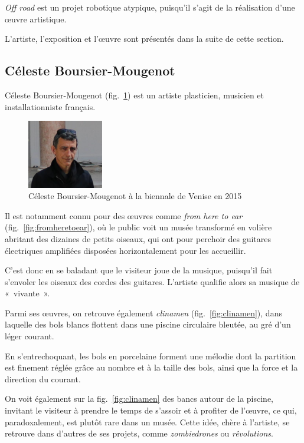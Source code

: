 \documentclass[french,A4paper,]{book}
\begin{document}
\emph{Off road} est un projet robotique atypique, puisqu'il s'agit de la
réalisation d'une œuvre artistique.

L'artiste, l'exposition et l'œuvre sont présentés dans la suite de cette
section.

\subsection{Céleste
Boursier-Mougenot}\label{cuxe9leste-boursier-mougenot}

Céleste Boursier-Mougenot (fig.~\ref{fig:celeste}) est un artiste
plasticien, musicien et installationniste français.

\begin{figure}
\centering
\includegraphics[height=3.00000cm]{imgs/celeste.jpg}
\caption{Céleste Boursier-Mougenot à la biennale de Venise en
2015}\label{fig:celeste}
\end{figure}

Il est notamment connu pour des œuvres comme \emph{from here to ear}
(fig.~\ref{fig:fromheretoear}), où le public voit un musée transformé en
volière abritant des dizaines de petits oiseaux, qui ont pour perchoir
des guitares électriques amplifiées disposées horizontalement pour les
accueillir.

C'est donc en se baladant que le visiteur joue de la musique, puisqu'il
fait s'envoler les oiseaux des cordes des guitares. L'artiste qualifie
alors sa musique de «~vivante~».

Parmi ses œuvres, on retrouve également \emph{clinamen}
(fig.~\ref{fig:clinamen}), dans laquelle des bols blancs flottent dans
une piscine circulaire bleutée, au gré d'un léger courant.

En s'entrechoquant, les bols en porcelaine forment une mélodie dont la
partition est finement réglée grâce au nombre et à la taille des bols,
ainsi que la force et la direction du courant.

On voit également sur la fig.~\ref{fig:clinamen} des bancs autour de la
piscine, invitant le visiteur à prendre le temps de s'assoir et à
profiter de l'œuvre, ce qui, paradoxalement, est plutôt rare dans un
musée. Cette idée, chère à l'artiste, se retrouve dans d'autres de ses
projets, comme \emph{zombiedrones} ou \emph{rêvolutions}.
\end{document}
